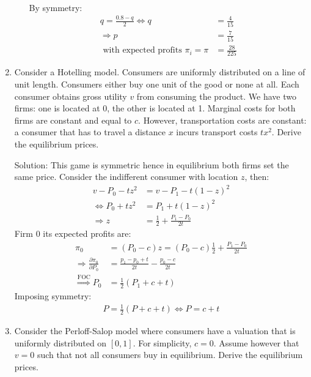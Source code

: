 \documentclass[12pt]{article}
\numberwithin{equation}{section}
\newcommand{\1}[1]{\,\mathbbm{1}_{#1}} %
\begin{document}
\begin{enumerate}
\begin{enumerate}
\begin{align*}
		            \end{align*}
		            By symmetry:
		            \begin{align*}
			            q=\frac{0.8-q}{2}\Longleftrightarrow q   & =\frac{4}{15}   \\
			            \Longrightarrow p                        & =\frac{7}{15}   \\
			            \text{ with expected profits } \pi_i=\pi & =\frac{28}{225}
		            \end{align*}
	      \end{enumerate}
	\item Consider a Hotelling model. Consumers are uniformly distributed on a line of unit
	      length. Consumers either buy one unit of the good or none at all. Each consumer
	      obtains gross utility $v$ from consuming the product. We have two firms: one is
	      located at 0, the other is located at 1. Marginal costs for both firms are constant
	      and equal to $c$. However, transportation costs are constant: a consumer that has
	      to travel a distance $x$ incurs transport costs $tx^2$. Derive the equilibrium prices.

	      Solution: This game is symmetric hence in equilibrium both firms set the same price.
	      Consider the indifferent consumer with location $z$, then:
	      \begin{align*}
		      v-P_0-tz^2                   & =v-P_1-t(1-z)^2                 \\
		      \Longleftrightarrow P_0+tz^2 & =P_1+t(1-z)^2                   \\
		      \Longrightarrow z            & =\frac{1}{2}+\frac{P_1-P_0}{2t}
	      \end{align*}
	      Firm 0 its expected profits are:
	      \begin{align*}
		      \pi_0                                             & =(P_0-c)z=(P_0-c)\frac{1}{2}+\frac{P_1-P_0}{2t} \\
		      \Longrightarrow\frac{\partial\pi_0}{\partial P_0} & =\frac{p_1-p_0+t}{2t}-\frac{p_0-c}{2t}          \\
		      \overset{\text{FOC}}{\Longrightarrow}P_0          & =\frac{1}{2}(P_1+c+t)
	      \end{align*}
	      Imposing symmetry:
	      \begin{align*}
		      P=\frac{1}{2}(P+c+t)\Longleftrightarrow P=c+t
	      \end{align*}
	\item Consider the Perloff-Salop model where consumers have a valuation that is uniformly
	      distributed on $[0, 1]$. For simplicity, $c = 0$. Assume however that $v = 0$ such
	      that not all consumers buy in equilibrium. Derive the equilibrium prices.


\end{enumerate}
\end{document}
